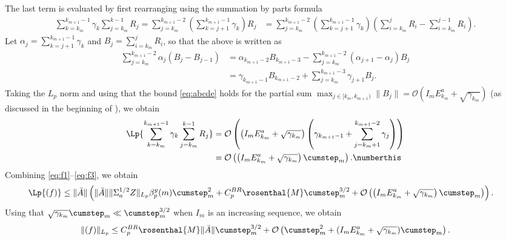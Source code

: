 \documentclass[11pt]{article}
\begin{document}
The last term is evaluated by first rearranging using the summation by parts formula
\begin{align*}
    \sum_{k=k_m}^{k_{m+1} - 1} \gamma_k \sum_{j=k_m}^{k-1} R_j
    = 
    \sum_{j=k_m}^{k_{m+1} - 2} \left(\sum_{k=j+1}^{k_{m+1} - 1} \gamma_k \right) R_j 
    &=
    \sum_{j=k_m}^{k_{m+1} - 2}\left(\sum_{k=j+1}^{k_{m+1} - 1} \gamma_k \right) \left(\sum_{i=k_m}^{j} R_i - \sum_{i=k_m}^{j-1} R_i \right)
    .
\end{align*}
Let $\alpha_j = \sum_{k=j+1}^{k_{m+1} - 1} \gamma_k$ and $B_j = \sum_{i=k_m}^{j} R_i$, so that the above is written as
\begin{align*}
    \sum_{j=k_m}^{k_{m+1} - 2} \alpha_j \left(B_j - B_{j-1} \right) 
    &=
    \alpha_{k_{m+1} - 2} B_{k_{m+1} - 3} - \sum_{j=k_m}^{k_{m+1} - 2} (\alpha_{j+1} - \alpha_j) B_j
    \\ &
    = \gamma_{k_{m+1} - 1} B_{k_{m+1} - 2} + \sum_{j=k_m}^{k_{m+1} - 3} \gamma_{j+1} B_j . 
\end{align*}
Taking the $L_p$ norm and using that the bound \eqref{eq:abcde} holds for the partial sum $\max_{j \in [k_m, k_{m+1})} \lVert B_j \rVert = \mathcal{O}(I_m E_{k_m}^a + \sqrt{\gamma_{k_m}})$ (as discussed in the beginning of ), we obtain 
\begin{align*}
    \Lp{    \sum_{k=k_m}^{k_{m+1} - 1} \gamma_k \sum_{j=k_m}^{k-1} R_j}
    &= \mathcal{O}\left( 
     \left(I_m E_{k_m}^a +  \sqrt{\gamma_{k_m}} \right) \left( \gamma_{k_{m+1} - 1} 
     + \sum_{j=k_m+1}^{k_{m+1} - 2} \gamma_j \right)
     \right)
     \\ &
     = \mathcal{O}\left(\left(I_m E_{k_m}^a +  \sqrt{\gamma_{k_m}} \right) \cumstep_m  \right). 
     \numberthis \label{eq:f3}
\end{align*}
Combining \eqref{eq:f1}--\eqref{eq:f3}, we obtain 
\begin{align*}
    \Lp{(f)}
    &\leq 
    \lVert \bar{A} \rVert \left(\lVert \bar{A} \rVert \lVert \Sigma_a^{1/2}Z \rVert_{L_p} \beta_p^y (m) \cumstep_m^2 + C_p^{BR} \rosenthal{M}\cumstep_m^{3/2} 
    + \mathcal{O}\left( \left(I_m E_{k_m}^a +\sqrt{\gamma_{k_m}}\right) \cumstep_m\right)\right)
    .
\end{align*}
Using that $\sqrt{\gamma_{k_m}} \cumstep_m \ll \cumstep_m^{3/2}$ when $I_m$ is an increasing sequence, we obtain
\begin{equation}\label{eq:f_bound}
    \lVert (f) \rVert_{L_p} 
    \leq C_p^{BR}\rosenthal{M} \lVert \bar{A} \rVert \cumstep_m^{3/2} + \mathcal{O}\left(
    \cumstep_m^2 + (I_m E_{k_m}^a + \sqrt{\gamma_{k_m}} )\cumstep_m \right) . 
\end{equation}
\end{document}
